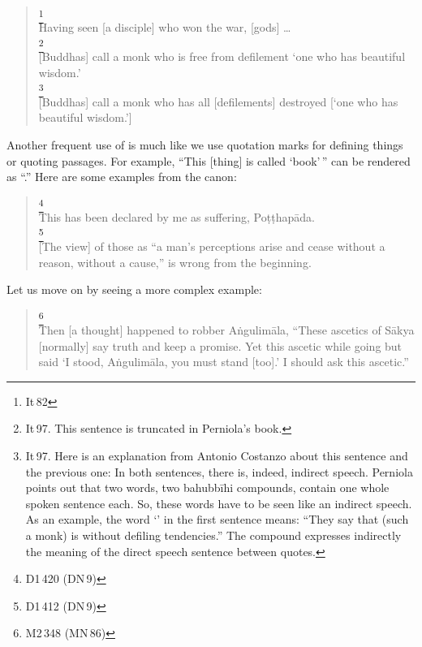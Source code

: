 \begin{quote}
\footnote{It\,82}\\
Having seen [a disciple] who won the war, [gods] \ldots\\[1.5mm]
\footnote{It\,97. This sentence is truncated in Perniola's book.}\\
{[Buddhas] call a monk who is free from defilement `one who has beautiful wisdom.'}\\[1.5mm]
\footnote{It\,97. Here is an explanation from Antonio Costanzo about this sentence and the previous one: In both sentences, there is, indeed, indirect speech. Perniola points out that two words, two bahubb\=ihi compounds, contain one whole spoken sentence each. So, these words have to be seen like an indirect speech. As an example, the word `' in the first sentence means: ``They say that (such a monk) is without defiling tendencies.'' The compound expresses indirectly the meaning of the direct speech sentence between quotes.}\\
{[Buddhas] call a monk who has all [defilements] destroyed [`one who has beautiful wisdom.']}\\[1.5mm]
\end{quote}

Another frequent use of  is much like we use quotation marks for defining things or quoting passages. For example, ``This [thing] is called `book'\,'' can be rendered as ``.'' Here are some examples from the canon:

\begin{quote}
\footnote{D1\,420 (DN\,9)}\\
This has been declared by me as suffering, Po\d t\d thap\=ada.\\[1.5mm]
\footnote{D1\,412 (DN\,9)}\\
{[The view] of those as ``a man's perceptions arise and cease without a reason, without a cause,'' is wrong from the beginning.}\\[1.5mm]
\end{quote}

Let us move on by seeing a more complex example:

\begin{quote}
\footnote{M2\,348 (MN\,86)}\\
{Then [a thought] happened to robber A\.ngulim\=ala, ``These ascetics of S\=akya [normally] say truth and keep a promise. Yet this ascetic while going but said `I stood, A\.ngulim\=ala, you must stand [too].' I should ask this ascetic.''}
\end{quote}


